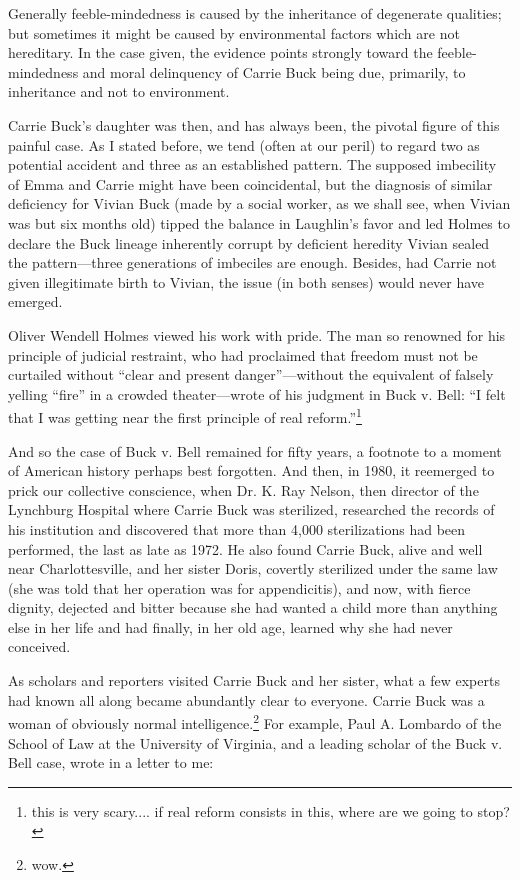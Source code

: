 \documentclass[12pt]{letter}
\begin{document}
Generally feeble-mindedness is caused by the inheritance of degenerate
qualities; but sometimes it might be caused by environmental factors which
are not hereditary. In the case given, the evidence points strongly toward the
feeble-mindedness and moral delinquency of Carrie Buck being due,
primarily, to inheritance and not to environment.

Carrie Buck’s daughter was then, and has always been, the pivotal figure of this painful
case. As I stated before, we tend (often at our peril) to regard two as potential accident
and three as an established pattern. The supposed imbecility of Emma and Carrie might
have been coincidental, but the diagnosis of similar deficiency for Vivian Buck (made by
a social worker, as we shall see, when Vivian was but six months old) tipped the balance
in Laughlin’s favor and led Holmes to declare the Buck lineage inherently corrupt by
deficient heredity Vivian sealed the pattern—three generations of imbeciles are enough.
Besides, had Carrie not given illegitimate birth to Vivian, the issue (in both senses) would
never have emerged.

Oliver Wendell Holmes viewed his work with pride. The man so renowned for his
principle of judicial restraint, who had proclaimed that freedom must not be curtailed
without “clear and present danger”—without the equivalent of falsely yelling “fire” in a
crowded theater—wrote of his judgment in Buck v. Bell: “I felt that I was getting near the
first principle of real reform.”\footnote{this is very scary.... if real reform consists in this, where are we going to stop?}

And so the case of Buck v. Bell remained for fifty years, a footnote to a moment of
American history perhaps best forgotten. And then, in 1980, it reemerged to prick our
collective conscience, when Dr. K. Ray Nelson, then director of the Lynchburg Hospital
where Carrie Buck was sterilized, researched the records of his institution and discovered
that more than 4,000 sterilizations had been performed, the last as late as 1972. He also
found Carrie Buck, alive and well near Charlottesville, and her sister Doris, covertly
sterilized under the same law (she was told that her operation was for appendicitis), and
now, with fierce dignity, dejected and bitter because she had wanted a child more than
anything else in her life and had finally, in her old age, learned why she had never
conceived.

As scholars and reporters visited Carrie Buck and her sister, what a few experts had
known all along became abundantly clear to everyone. Carrie Buck was a woman of
obviously normal intelligence.\footnote{wow.} For example, Paul A. Lombardo of the School of Law at
the University of Virginia, and a leading scholar of the Buck v. Bell case, wrote in a letter
to me:
\end{document}
